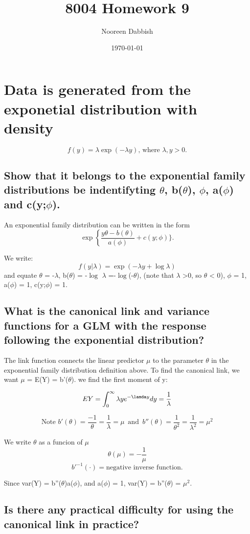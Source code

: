 \documentclass[11pt]{article}
\title{8004 Homework 9}
\author{Nooreen Dabbish}
\date{\today}
\begin{document}
\maketitle




\section{Data is generated from the exponetial distribution with density}
\label{sec-1}

$$f(y) = \lambda \exp (-\lambda y),\, \text{where}\,\,\lambda,y>0.$$
\subsection{Show that it belongs to the exponential family distributions be indentifyting $\theta$, b($\theta$), $\phi$, a($\phi$) and c(y;$\phi$).}
\label{sec-1-1}


An exponential family distribution can be written in the form
$$\exp\left\{ \frac{y\theta - b(\theta)}{a(\phi)} + c(y;\phi) \bigg\}.$$

We write: $$f(y|\lambda) = \exp(-\lambda y + \log \lambda)$$ and
equate $\theta$ = -$\lambda$, b($\theta$) = -$\log$ $\lambda$ =-$\log$(-$\theta$),
(note that $\lambda$ >0, so $\theta$ < 0), 
$\phi$ = 1, a($\phi$) = 1, c(y;$\phi$) = 1.
\subsection{What is the canonical link and variance functions for a GLM with the response following the exponential distribution?}
\label{sec-1-2}


The link function connects the linear predictor $\mu$ to the parameter
$\theta$ in the exponential family distribution definition above. To
find the canonical link, we want $\mu$ = E(Y) = b'($\theta$). we find the first moment of y:

$$EY = \int_0^\infty \lambda y e^{-\lamda y} dy = \frac{1}{\lambda}$$

$$\text{Note}\,\, b'(\theta) = \frac{-1}{\theta} = \frac{1}{\lambda} =
\mu\,\,\,\text{and}\,\,\,b''(\theta) = \frac{1}{\theta^2} =
\frac{1}{\lambda^2} = \mu^2$$

We write $\theta$ as a funcion of $\mu$ $$\theta(\mu) = -\frac{1}{\mu}$$
$$b'^{-1}(\cdot) = \text{negative inverse function.}$$

Since var(Y) = b''($\theta$)a($\phi$), and a($\phi$) = 1, var(Y) =
b''($\theta$)  = $\mu$$^2$.
\subsection{Is there any practical difficulty for using the canonical link in practice?}
\label{sec-1-3}
\end{document}
